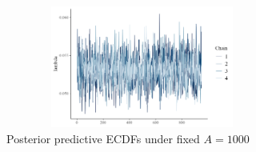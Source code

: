 \pagebreak
\begin{figure}[H]
    \centering
    \includegraphics[height=4cm, width=0.8\textwidth]{images/sanitycheck_exp_post_lambda.png}
    \caption{{\small Posterior predictive ECDFs under fixed $A=1000$}}
    \label{fig:ppc_a1000}
\end{figure}